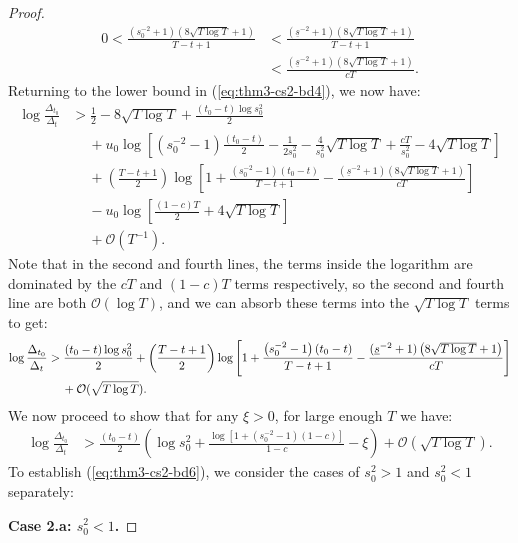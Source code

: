 \documentclass{article}
\begin{document}
\begin{proof}
\begin{align*}
     0 < \frac{\left(s_0^{-2} + 1\right)\left(8\sqrt{T\log T} +1\right)}{T - t + 1} &<  \frac{(\underline{s}^{-2} + 1)\left(8\sqrt{T\log T} +1\right)}{T - t + 1} \\
     &< \frac{(\underline{s}^{-2} + 1)\left(8\sqrt{T\log T} +1\right)}{cT}. \tag{$T-t+1 > cT$}  
\end{align*}
Returning to the lower bound in (\ref{eq:thm3-cs2-bd4}), we now have:
\begin{align*}
    \log \frac{\Delta_{t_0}}{\Delta_t} &> \frac{1}{2}-8\sqrt{T \log T} + \frac{(t_0 - t)\log s_0^2}{2} \\
    &\quad\: + u_0 \log\left[ (s_0^{-2}-1)\frac{(t_0 - t)}{2} -\frac{1}{2s_0^2} - \frac{4}{s_0^2} \sqrt{T\log T} + \frac{cT}{s_0^2} - 4 \sqrt{T \log T}\right] \\
    &\quad\: + \left(\frac{T - t + 1}{2}\right)\log\left[1 + \frac{\left(s_0^{-2} -1\right)(t_0 - t)}{T - t + 1} -  \frac{(\underline{s}^{-2} + 1)\left(8\sqrt{T\log T} +1\right)}{cT}\right]  \\
    &\quad\: - u_0\log\left[\frac{(1-c)T}{2} + 4\sqrt{T\log T}\right] \\
    &\quad\: +  \mathcal{O}(T^{-1}). 
\end{align*}
Note that in the second and fourth lines, the terms inside the logarithm are dominated by the $cT$ and $(1-c)T$ terms respectively, so the second and fourth line are both $\mathcal{O}(\log T)$, and we can absorb these terms into the $\sqrt{T \log T}$ terms to get: 
\begin{align}
    \log \frac{\Delta_{t_0}}{\Delta_t} &> \frac{(t_0 - t)\log s_0^2}{2} + \left(\frac{T - t + 1}{2}\right)\log\left[1 + \frac{\left(s_0^{-2} -1\right)(t_0 - t)}{T - t + 1} -  \frac{(\underline{s}^{-2} + 1)\left(8\sqrt{T\log T} +1\right)}{cT}\right] \notag \\
    &\quad\: + \mathcal{O}(\sqrt{T \log T}). \label{eq:thm3-cs2-bd5} 
\end{align}
We now proceed to show that for any $\xi > 0$, for large enough $T$ we have:
\begin{align}
    \log \frac{\Delta_{t_0}}{\Delta_t} &> \frac{(t_0 - t)}{2} \left(\log s_0^2 + \frac{\log[1 +  (s_0^{-2} -1)(1-c)]}{1-c} - \xi\right)  + \mathcal{O}(\sqrt{T \log T}). \label{eq:thm3-cs2-bd6} 
\end{align}
To establish (\ref{eq:thm3-cs2-bd6}), we consider the cases of $s_0^2 > 1$ and $s_0^2 < 1$ separately:

\textbf{Case 2.a: $s_0^2 < 1$.}


\end{proof}
\end{document}
